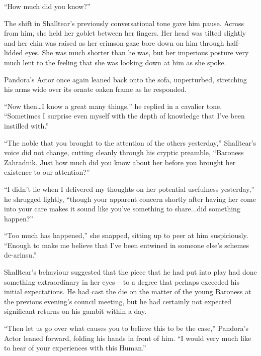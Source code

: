 “How much did you know?”

 

The shift in Shalltear’s previously conversational tone gave him pause. Across from him, she held her goblet between her fingers. Her head was tilted slightly and her chin was raised as her crimson gaze bore down on him through half-lidded eyes. She was much shorter than he was, but her imperious posture very much lent to the feeling that she was looking down at him as she spoke.

 

Pandora’s Actor once again leaned back onto the sofa, unperturbed, stretching his arms wide over its ornate oaken frame as he responded.

 

“Now then…I know a great many things,” he replied in a cavalier tone. “Sometimes I surprise even myself with the depth of knowledge that I’ve been instilled with.”

 

“The noble that you brought to the attention of the others yesterday,” Shalltear’s voice did not change, cutting cleanly through his cryptic preamble, “Baroness Zahradnik. Just how much did you know about her before you brought her existence to our attention?”

 

“I didn’t lie when I delivered my thoughts on her potential usefulness yesterday,” he shrugged lightly, “though your apparent concern shortly after having her come into your care makes it sound like you’ve something to share...did something happen?”

 

“Too much has happened,” she snapped, sitting up to peer at him suspiciously. “Enough to make me believe that I’ve been entwined in someone else’s schemes de-arinsu.”

 

Shalltear’s behaviour suggested that the piece that he had put into play had done something extraordinary in her eyes – to a degree that perhaps exceeded his initial expectations. He had cast the die on the matter of the young Baroness at the previous evening’s council meeting, but he had certainly not expected significant returns on his gambit within a day.

 

“Then let us go over what causes you to believe this to be the case,” Pandora’s Actor leaned forward, folding his hands in front of him. “I would very much like to hear of your experiences with this Human.”

